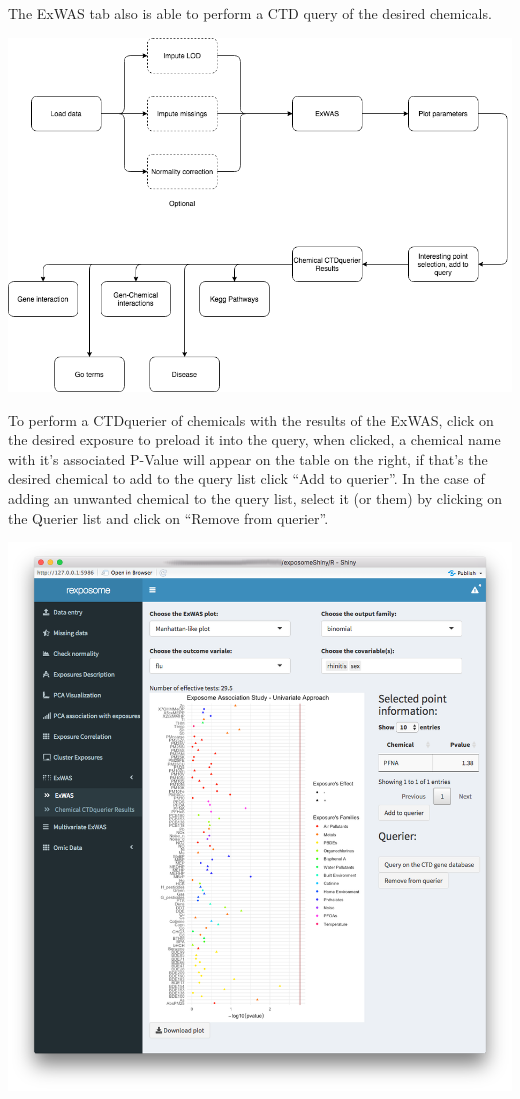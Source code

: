 \documentclass[
]{book}
\begin{document}
The ExWAS tab also is able to perform a CTD query of the desired chemicals.

\includegraphics{images/analysis7_3.png}

To perform a CTDquerier of chemicals with the results of the ExWAS, click on the desired exposure to preload it into the query, when clicked, a chemical name with it's associated P-Value will appear on the table on the right, if that's the desired chemical to add to the query list click ``Add to querier''. In the case of adding an unwanted chemical to the query list, select it (or them) by clicking on the Querier list and click on ``Remove from querier''.

\includegraphics{images/analysis7_4.png}
\end{document}
